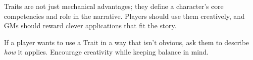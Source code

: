 Traits are not just mechanical advantages; they define a character’s core competencies and role in the narrative. Players should use them creatively, and GMs should reward clever applications that fit the story.

\begin{GmTips}
 	If a player wants to use a Trait in a way that isn’t obvious, ask them to describe \emph{how} it applies. Encourage creativity while keeping balance in mind.
\end{GmTips}

